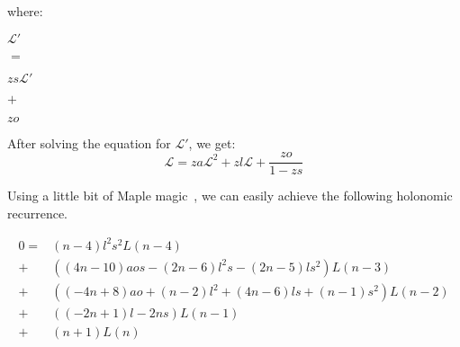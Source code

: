 \documentclass[final]{article}
\theoremstyle{definition}
\theoremstyle{remark}
\newcommand{\gf}[1]{\ensuremath{\mathcal{#1}}}
\begin{document}
where:

\begin{center}
    \begin{minipage}[t]{.2\textwidth}
        \begin{center}
            \(\gf{L'}\)\\
        \end{center}
    \end{minipage}%
    \begin{minipage}[t]{.05\textwidth}
        \begin{center}
            \(=\)\\
        \end{center}
    \end{minipage}%
    \begin{minipage}[t]{.2\textwidth}
        \begin{center}
            \(z s \gf{L'}\)\\
        \end{center}
    \end{minipage}%
    \begin{minipage}[t]{.05\textwidth}
        \begin{center}
            \(+\)\\
        \end{center}
    \end{minipage}%
    \begin{minipage}[t]{.2\textwidth}
        \begin{center}
            \(z o\)\\
        \end{center}
    \end{minipage}%
\end{center}

After solving the equation for \(\gf{L'}\), we get:
\[\gf{L} = z a \gf{L}^2 + z l \gf{L} + \frac{z o}{1 - z s}\]

Using a little bit of Maple magic~\cite{gfun}, we can easily achieve the following holonomic recurrence.

\[\begin{array}{rl}
        0 =& (n - 4) l^2 s^2 L(n - 4)\\
        +& ((4 n - 10) a o s - (2 n - 6) l^2 s - (2 n - 5) l s^2) L(n - 3)\\
        +& ((-4 n + 8) a o + (n - 2) l^2 + (4 n - 6) l s + (n - 1) s^2) L(n - 2)\\
        +& ((-2 n + 1) l - 2 n s) L(n - 1)\\
        +& (n + 1) L(n)
\end{array}\]
\end{document}
